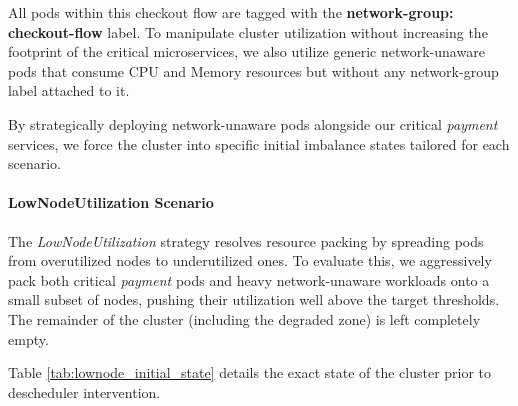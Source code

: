 All pods within this checkout flow are tagged with the \textbf{network-group: checkout-flow} label. To manipulate cluster utilization without increasing the footprint of the critical microservices, we also utilize generic network-unaware pods that consume CPU and Memory resources but without any network-group label attached to it.

By strategically deploying network-unaware pods alongside our critical \textit{payment} services, we force the cluster into specific initial imbalance states tailored for each scenario.

\paragraph{LowNodeUtilization Scenario}
\label{subsubsec:netaware4_workload_lownode}
The \textit{LowNodeUtilization} strategy resolves resource packing by spreading pods from overutilized nodes to underutilized ones. To evaluate this, we aggressively pack both critical \textit{payment} pods and heavy network-unaware workloads onto a small subset of nodes, pushing their utilization well above the target thresholds. The remainder of the cluster (including the degraded zone) is left completely empty.

Table \ref{tab:lownode_initial_state} details the exact state of the cluster prior to descheduler intervention.

\begin{table}[tbp]
    \centering
    \caption{Resource Allocation: Initial State for LowNodeUtilization Strategy}
    \label{tab:lownode_initial_state}
\end{table}

